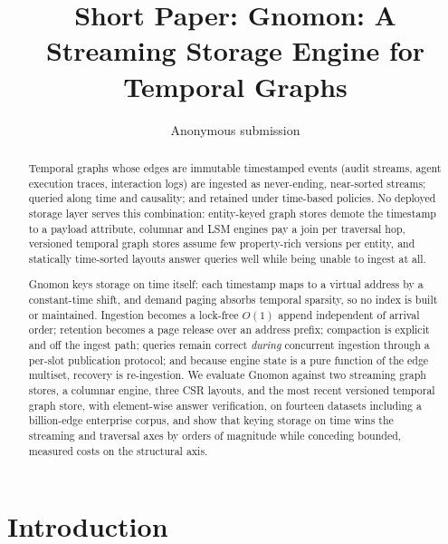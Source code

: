 \documentclass[letterpaper,twocolumn,10pt]{article}
\newcommand{\sys}{Gnomon\xspace}
\begin{document}
\title{\Large \bf Short Paper: Gnomon: A Streaming Storage Engine for Temporal Graphs}

\author{Anonymous submission}

\maketitle

\begin{abstract}
Temporal graphs whose edges are immutable timestamped events (audit streams, agent execution traces, interaction logs) are
ingested as
never-ending, near-sorted streams; queried along time and causality;
and retained under time-based policies. No deployed storage layer
serves this combination: entity-keyed graph stores demote the
timestamp to a payload attribute, columnar and LSM engines pay a join
per traversal hop, versioned temporal graph stores assume few
property-rich versions per entity, and statically time-sorted layouts
answer queries well while being unable to ingest at all.

\sys keys storage on time itself: each timestamp maps to a virtual
address by a constant-time shift, and demand paging absorbs temporal
sparsity, so no index is built or maintained. Ingestion becomes a
lock-free $O(1)$ append independent of arrival order; retention
becomes a page release over an address prefix; compaction is explicit
and off the ingest path; queries remain correct \emph{during}
concurrent ingestion through a per-slot publication protocol; and
because engine state is a pure function of the edge multiset, recovery
is re-ingestion. We evaluate \sys against two streaming graph stores, a
columnar engine, three CSR layouts, and the most recent versioned
temporal graph store, with
element-wise answer verification, on fourteen datasets including a
billion-edge enterprise corpus, and show that keying storage on time
wins the streaming and traversal axes by orders of magnitude while
conceding bounded, measured costs on the structural axis.
\end{abstract}

\section{Introduction}
\label{sec:intro}
\end{document}
